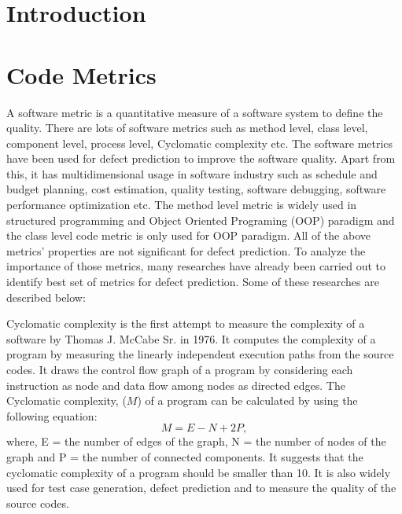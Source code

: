 \documentclass[12pt]{report}
\begin{document}
\section{Introduction}
\section{Code Metrics}
    
A software metric is a quantitative measure of a software system to define the quality. There are lots of software metrics such as method level, class level, component level, process level, Cyclomatic complexity etc. The software metrics have been used for defect prediction to improve the software quality. Apart from this, it has multidimensional usage in software industry such as schedule and budget planning, cost estimation, quality testing, software debugging, software performance optimization etc. The method level metric is widely used in structured programming and Object Oriented Programing (OOP) paradigm and the class level code metric is only used for OOP paradigm. All of the above metrics' properties are not significant for defect prediction. To analyze the importance of those metrics, many researches have already been carried out to identify best set of metrics for defect prediction. Some of these researches are described below:
 
Cyclomatic complexity is the first attempt to measure the complexity of a software by Thomas J. McCabe Sr. in 1976\cite{mccabe1976complexity}. It computes the complexity of a program by measuring the linearly independent execution paths from the source codes. It draws the control flow graph of a program by considering each instruction as node and data flow among nodes as directed edges. The Cyclomatic complexity, ($M$) of a program can be calculated by using the following equation:  
	\[M = E − N + 2P,\] where,
E = the number of edges of the graph,
N = the number of nodes of the graph and 
P = the number of connected components.
It suggests that the cyclomatic complexity of a program should be smaller than 10. It is also widely used for test case generation, defect prediction and to measure the quality of the source codes. 
\end{document}
